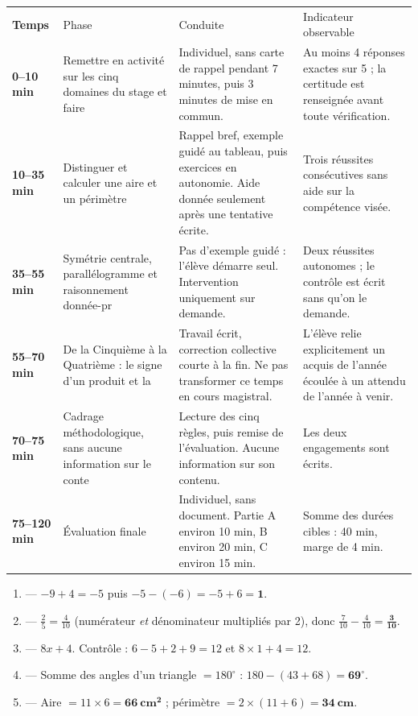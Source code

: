 \documentclass[10pt,a4paper]{article}
\begin{document}
\par\noindent\begin{tabularx}{\linewidth}{>{\bfseries}p{18mm} p{34mm} X X}
\rowcolor{Navy}\color{white}Temps & \color{white}Phase & \color{white}Conduite & \color{white}Indicateur observable \\
0--10 min & Remettre en activité sur les cinq domaines du stage et faire & Individuel, sans carte de rappel pendant 7 minutes, puis 3 minutes de mise en commun. & Au moins 4 réponses exactes sur 5 ; la certitude est renseignée avant toute vérification. \\
10--35 min & Distinguer et calculer une aire et un périmètre & Rappel bref, exemple guidé au tableau, puis exercices en autonomie. Aide donnée seulement après une tentative écrite. & Trois réussites consécutives sans aide sur la compétence visée. \\
35--55 min & Symétrie centrale, parallélogramme et raisonnement donnée-pr & Pas d'exemple guidé : l'élève démarre seul. Intervention uniquement sur demande. & Deux réussites autonomes ; le contrôle est écrit sans qu'on le demande. \\
55--70 min & De la Cinquième à la Quatrième : le signe d'un produit et la & Travail écrit, correction collective courte à la fin. Ne pas transformer ce temps en cours magistral. & L'élève relie explicitement un acquis de l'année écoulée à un attendu de l'année à venir. \\
70--75 min & Cadrage méthodologique, sans aucune information sur le conte & Lecture des cinq règles, puis remise de l'évaluation. Aucune information sur son contenu. & Les deux engagements sont écrits. \\
75--120 min & Évaluation finale & Individuel, sans document. Partie A environ 10 min, B environ 20 min, C environ 15 min. & Somme des durées cibles : 40 min, marge de 4 min. \\
\end{tabularx}
\newpage{}
\begin{enumerate}
\item {} --- $-9+4=-5$ puis $-5-(-6)=-5+6=\mathbf{1}$.
\item {} --- $\frac{2}{5}=\frac{4}{10}$ (numérateur \emph{et} dénominateur multipliés par 2), donc $\frac{7}{10}-\frac{4}{10}=\mathbf{\frac{3}{10}}$.
\item {} --- $8x+4$. Contrôle : $6-5+2+9=12$ et $8\times 1+4=12$.
\item {} --- Somme des angles d'un triangle $=180^\circ$ : $180-(43+68)=\mathbf{69^\circ}$.
\item {} --- Aire $=11\times 6=\mathbf{66\ \text{cm}^2}$ ; périmètre $=2\times(11+6)=\mathbf{34\ \text{cm}}$.
\end{enumerate}
\end{document}
